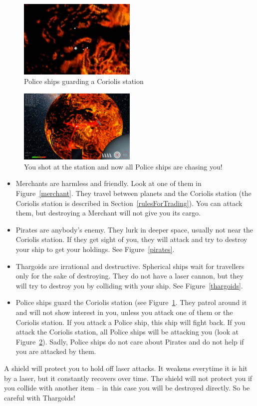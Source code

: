 \documentclass[a4paper,11pt]{article}
\begin{document}
\begin{figure}[ht]
	\centering
		\includegraphics[width=0.50\textwidth]{policeguarding.jpg}
		\caption{Police ships guarding a Coriolis station\label{police}}
\end{figure}\begin{figure}[ht]
	\centering
		\includegraphics[width=0.50\textwidth]{allpoliceshooting.jpg}
		\caption{You shot at the station and now all Police ships are chasing you!\label{allshooting}}
\end{figure}
\begin{itemize}
 \item Merchants are harmless and friendly. Look at one of them in Figure~\ref{merchant}. They travel between planets and the Coriolis station (the Coriolis station is described in Section~\ref{rulesForTrading}). You can attack them, but destroying a Merchant will not give you its cargo.
 \item Pirates are anybody's enemy. They lurk in deeper space, usually  not near the Coriolis station. If they get sight of you, they will attack and try to destroy your ship to get your holdings. See Figure~\ref{pirates}.
 \item Thargoids are irrational and destructive. Spherical ships wait for travellers only for the sake of destroying. They do not have a laser cannon, but they will try to destroy you by colliding with your ship. See Figure~\ref{thargoids}.
 \item Police ships guard the Coriolis station (see Figure~\ref{police}. They patrol around it and will not show interest in you, unless you attack one of them or the Coriolis station. If you attack a Police ship, this ship will fight back. If you attack the Coriolis station, all Police ships will be attacking you (look at Figure~\ref{allshooting}).
Sadly, Police ships do not care about Pirates and do not help if you are attacked by them.
\end{itemize}
A shield will protect you to hold off laser attacks. It weakens everytime it is hit by a laser, but it constantly recovers over time. The shield will not protect you if you collide with another item -- in this case you will be destroyed directly. So be careful with Thargoids!\\
\ \\
\end{document}

